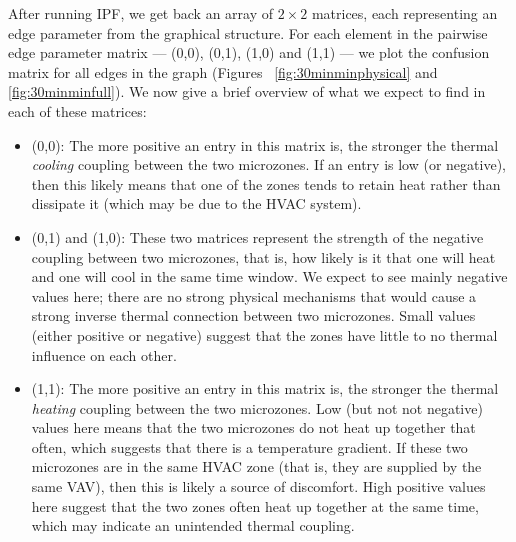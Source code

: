 After running IPF, we get back an array of $2\times 2$ matrices, each representing an edge parameter from the graphical structure.
For each element in the pairwise edge parameter matrix --- (0,0), (0,1), (1,0) and (1,1) --- we plot the confusion matrix for all edges in the graph (Figures ~\ref{fig:30minminphysical} and \ref{fig:30minminfull}).
We now give a brief overview of what we expect to find in each of these matrices:

\begin{itemize}[noitemsep,nolistsep]
\item (0,0): The more positive an entry in this matrix is, the stronger the thermal \emph{cooling} coupling between the two microzones.
If an entry is low (or negative), then this likely means that one of the zones tends to retain heat rather than dissipate it (which may be due to the HVAC system).
\item (0,1) and (1,0): These two matrices represent the strength of the negative coupling between two microzones, that is, how likely is it that one will heat and one will cool in the same time window.
We expect to see mainly negative values here; there are no strong physical mechanisms that would cause a strong inverse thermal connection between two microzones.
Small values (either positive or negative) suggest that the zones have little to no thermal influence on each other.
\item (1,1): The more positive an entry in this matrix is, the stronger the thermal \emph{heating} coupling between the two microzones.
Low (but not not negative) values here means that the two microzones do not heat up together that often, which suggests that there is a temperature gradient.
If these two microzones are in the same HVAC zone (that is, they are supplied by the same VAV), then this is likely a source of discomfort.
High positive values here suggest that the two zones often heat up together at the same time, which may indicate an unintended thermal coupling.
\end{itemize}

